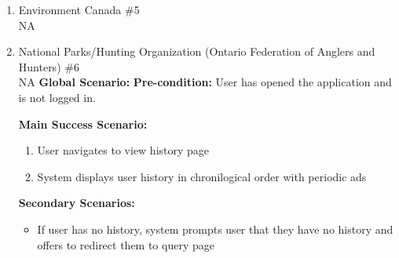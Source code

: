 \documentclass[]{article}
\begin{document}
\begin{enumerate}[{\bf BE1.}]
\begin{enumerate}[{\bf VP1.}]
            \item Environment Canada \#5 \\
                \newline NA
    
            \item National Parks/Hunting Organization (Ontario Federation of Anglers and Hunters) \#6 \\
                \newline NA
        \textbf{Global Scenario:}
        \noindent \textbf{Pre-condition:} User has opened the application and is not logged in.
    
            \noindent \textbf{Main Success Scenario:}
            \begin{enumerate}
                \item User navigates to view history page
                \item System displays user history in chronilogical order with periodic ads
            \end{enumerate}
    
            \noindent \textbf{Secondary Scenarios:}
            \begin{itemize}
                \item If user has no history, system prompts user that they have no history and offers to redirect them to query page
            \end{itemize}
        \end{enumerate}
    


\end{enumerate}
\end{document}
